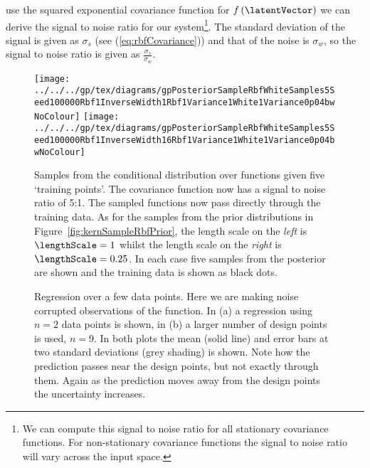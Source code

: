 use the squared exponential covariance function for
$f\left(\latentVector\right)$ we can derive the signal to noise ratio for
our system\footnote{We can compute this signal to noise ratio for all
  stationary covariance functions. For non-stationary covariance
  functions the signal to noise ratio will vary across the input
  space.}. The standard deviation of the signal is given as $\sigma_s$
(see (\ref{eq:rbfCovariance})) and that of the noise is $\sigma_w$, so
the signal to noise ratio is given as $\frac{\sigma_s}{\sigma_w}$.
\begin{figure}[htb]
  \texttt{[image: ../../../gp/tex/diagrams/gpPosteriorSampleRbfWhiteSamples5Seed100000Rbf1InverseWidth1Rbf1Variance1White1Variance0p04bwNoColour]}\hfill
  \texttt{[image: ../../../gp/tex/diagrams/gpPosteriorSampleRbfWhiteSamples5Seed100000Rbf1InverseWidth16Rbf1Variance1White1Variance0p04bwNoColour]}


  \caption{Samples from the conditional distribution over functions
    given five `training points'. The covariance function now has a
    signal to noise ratio of 5:1. The sampled functions now pass
    directly through the training data. As for the samples from the
    prior distributions in Figure~\ref{fig:kernSampleRbfPrior}, the
    length scale on the \emph{left} is $\lengthScale=1$ whilst the
    length scale on the \emph{right} is $\lengthScale=0.25$. In each
    case five samples from the posterior are shown and the training
    data is shown as black dots.\label{fig:kernSampleRbfPosterior}}
\end{figure}


\begin{figure}[htb]
  \hfill


  \caption{Regression over a few data points. Here we are making noise
    corrupted observations of the function. In (a) a regression using
    $n=2$ data points is shown, in (b) a larger number of design
    points is used, $n=9$. In both plots the mean (solid line) and
    error bars at two standard deviations (grey shading) is
    shown. Note how the prediction passes near the design points, but
    not exactly through them. Again as the prediction moves away from
    the design points the uncertainty increases.}
\end{figure}

